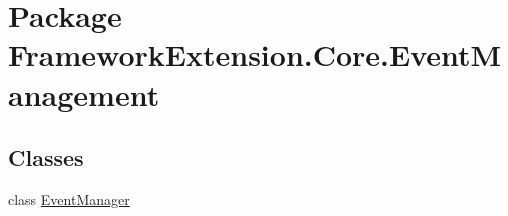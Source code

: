 \hypertarget{namespace_framework_extension_1_1_core_1_1_event_management}{\section{Package Framework\-Extension.\-Core.\-Event\-Management}
\label{namespace_framework_extension_1_1_core_1_1_event_management}
}
\subsection*{Classes}
\begin{DoxyCompactItemize}
\item 
class \hyperlink{class_framework_extension_1_1_core_1_1_event_management_1_1_event_manager}{Event\-Manager}
\end{DoxyCompactItemize}
